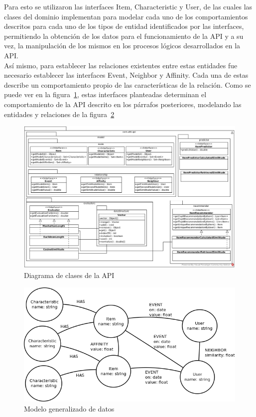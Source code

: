   Para esto se utilizaron las interfaces Item, Characteristic y User, de las cuales las clases del dominio implementan para modelar cada uno de los comportamientos descritos para cada uno de los tipos de entidad identificados por las interfaces, permitiendo la obtención de los datos para el funcionamiento de la API y a su vez, la manipulación de los mismos en los procesos lógicos desarrollados en la API.\\

  Así mismo, para establecer las relaciones existentes entre estas entidades fue necesario establecer las interfaces Event, Neighbor y Affinity. Cada una de estas describe un comportamiento propio de las características de la relación. Como se puede ver en la figura~\ref{fig:p3_interfaces}, estas interfaces planteadas determinan el comportamiento de la API descrito en los párrafos posteriores, modelando las entidades y relaciones de la figura~\ref{fig:p3_general_model}

  \begin{landscape}
    \begin{figure}[h!]
      \centering
      \includegraphics[width=24cm]{./images/classes_api}
      \caption{Diagrama de clases de la API}
      \label{fig:p3_interfaces}
    \end{figure}
  \end{landscape}

    \begin{figure}[h!]
      \centering
      \includegraphics[width=16cm]{./images/general_data_model}
      \caption{Modelo generalizado de datos}
      \label{fig:p3_general_model}
    \end{figure}

